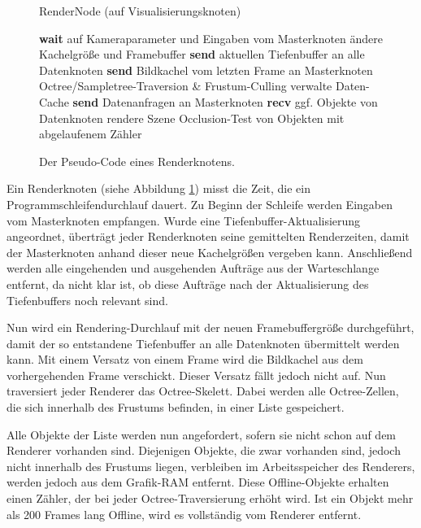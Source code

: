 \begin{figure}[h]
\centering
 \begin{minipage}[t]{12.5cm}
\begin{algorithm}[H]
  \caption{RenderNode (auf Visualisierungsknoten)\label{alg:impl:rendernode}} 
    \begin{algorithmic} [1]
	\STATE \textbf{wait} auf Kameraparameter und Eingaben vom Masterknoten
	  \STATE ändere Kachelgröße und Framebuffer
	  \STATE \textbf{send} aktuellen Tiefenbuffer an alle Datenknoten
	\ENDIF
	\STATE \textbf{send} Bildkachel vom letzten Frame an Masterknoten
	\STATE Octree/Sampletree-Traversion \& Frustum-Culling
	\STATE verwalte Daten-Cache
	\STATE \textbf{send} Datenanfragen an Masterknoten
	\STATE \textbf{recv} ggf. Objekte von Datenknoten
	\STATE rendere Szene
	\STATE Occlusion-Test von Objekten mit abgelaufenem Zähler
      \ENDWHILE
    \end{algorithmic}
\end{algorithm}
 \end{minipage}
\caption{\label{fig:impl:rendernode}Der Pseudo-Code eines Renderknotens.}
\end{figure}
Ein Renderknoten (siehe Abbildung \ref{fig:impl:rendernode}) misst die Zeit, die ein Programmschleifendurchlauf dauert. Zu Beginn der Schleife werden Eingaben vom Masterknoten empfangen. Wurde eine Tiefenbuffer-Aktualisierung angeordnet, überträgt jeder Renderknoten seine gemittelten Renderzeiten, damit der Masterknoten anhand dieser neue Kachelgrößen vergeben kann. Anschließend werden alle eingehenden und ausgehenden Aufträge aus der Warteschlange entfernt, da nicht klar ist, ob diese Aufträge nach der Aktualisierung des Tiefenbuffers noch relevant sind. 

Nun wird ein Rendering-Durchlauf mit der neuen Framebuffergröße durchgeführt, damit der so entstandene Tiefenbuffer an alle Datenknoten übermittelt werden kann. Mit einem Versatz von einem Frame wird die Bildkachel aus dem vorhergehenden Frame verschickt. Dieser Versatz fällt jedoch nicht auf. Nun traversiert jeder Renderer das Octree-Skelett. Dabei werden alle Octree-Zellen, die sich innerhalb des Frustums befinden, in einer Liste gespeichert. 

Alle Objekte der Liste werden nun angefordert, sofern sie nicht schon auf dem Renderer vorhanden sind. Diejenigen Objekte, die zwar vorhanden sind, jedoch nicht innerhalb des Frustums liegen, verbleiben im Arbeitsspeicher des Renderers, werden jedoch aus dem Grafik-RAM entfernt. Diese Offline-Objekte erhalten einen Zähler, der bei jeder Octree-Traversierung erhöht wird. Ist ein Objekt mehr als 200 Frames lang Offline, wird es vollständig vom Renderer entfernt.


